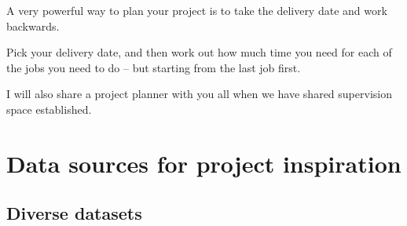 \documentclass[
]{book}
\begin{document}
A very powerful way to plan your project is to take the delivery date
and work backwards.

Pick your delivery date, and then work out how much time you need for
each of the jobs you need to do -- but starting from the last job first.

I will also share a project planner with you all when we have shared
supervision space established.

\hypertarget{data-sources-for-project-inspiration}{%
\chapter{Data sources for project inspiration}\label{data-sources-for-project-inspiration}}

\hypertarget{diverse-datasets}{%
\section{Diverse datasets}\label{diverse-datasets}}
\end{document}
